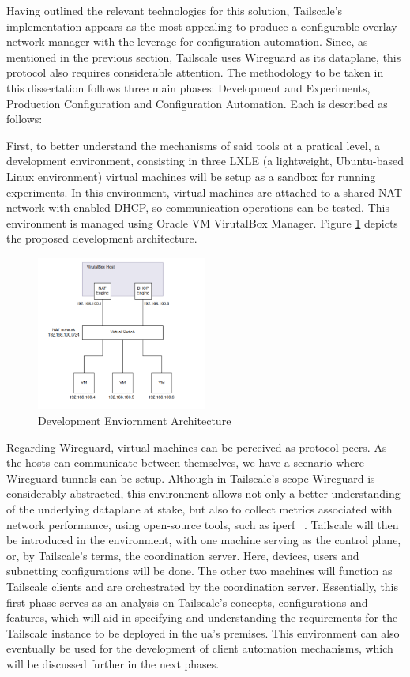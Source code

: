 \documentclass[11pt,twoside,a4paper]{report}
\begin{document}
Having outlined the relevant technologies for this solution, Tailscale's implementation appears as the most appealing to produce a configurable overlay network manager with the leverage for configuration automation. Since, as mentioned in the previous section, Tailscale uses Wireguard as its dataplane, this protocol also requires considerable attention. The methodology to be taken in this dissertation follows three main phases: Development and Experiments, Production Configuration and Configuration Automation. Each is described as follows:

First, to better understand the mechanisms of said tools at a pratical level, a development environment, consisting in three LXLE (a lightweight, Ubuntu-based Linux environment) virtual machines will be setup as a sandbox for running experiments. In this environment, virtual machines are attached to a shared NAT network with enabled DHCP, so communication operations can be tested. This environment is managed using Oracle VM VirutalBox Manager. Figure \ref{fig:sandbox} depicts the proposed development architecture.

\begin{figure}[h]
\centering
\includegraphics[width=0.5\textwidth]{dev.png}
\caption{Development Enviornment Architecture}
\label{fig:sandbox}
\end{figure}

Regarding Wireguard, virtual machines can be perceived as protocol peers. As the hosts can communicate between themselves, we have a scenario where Wireguard tunnels can be setup. Although in Tailscale's scope Wireguard is considerably abstracted, this environment allows not only a better understanding of the underlying dataplane at stake, but also to collect metrics associated with network performance, using open-source tools, such as iperf ~\cite{iperfws}. Tailscale will then be introduced in the environment, with one machine serving as the control plane, or, by Tailscale's terms, the coordination server. Here, devices, users and subnetting configurations will be done. The other two machines will function as Tailscale clients and are orchestrated by the coordination server. Essentially, this first phase serves as an analysis on Tailscale's concepts, configurations and features, which will aid in specifying and understanding the requirements for the Tailscale instance to be deployed in the \acrshort{ua}'s premises. This environment can also eventually be used for the development of client automation mechanisms, which will be discussed further in the next phases.
\end{document}

